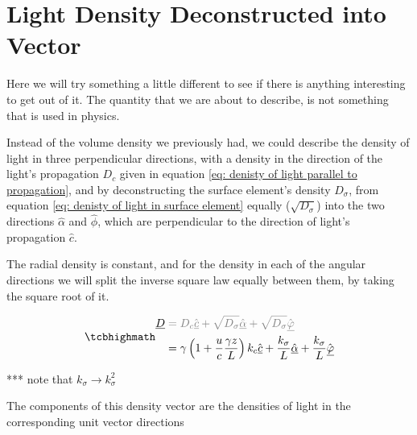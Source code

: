 \section{Light Density Deconstructed into Vector}\label{sect: Field Vector Density}

Here we will try something a little different to see if there is anything interesting to get out of it. The quantity that we are about to describe, is not something that is used in physics.

Instead of the volume density we previously had, we could describe the density of light in three perpendicular directions, with a density in the direction of the light's propagation $D_c$ given in equation \eqref{eq: denisty of light parallel to propagation}, and by deconstructing the surface element's density $D_\sigma$, from equation \eqref{eq: denisty of light in surface element} equally ($\sqrt{D_\sigma}$) into the two directions $\hat{\alpha}$ and $\hat{\phi}$, which are perpendicular to the direction of light's propagation $\hat{c}$.

The radial density is constant, and for the density in each of the angular directions we will split the inverse square law equally between them, by taking the square root of it.


\begin{equation}
	\label{eq: density vector}
	\mhl{
		\begin{aligned}
			\underline{D} & \color{gray} = D_{c} \hat{\underline{c}} + \sqrt{D_{\sigma}}  \hat{\underline{\alpha}} + \sqrt{D_{\sigma}} \hat{\underline{\varphi}}                                           \\
			              & = {\gamma}\left(1 + \dfrac{u}{c}\frac{\gamma z}{L}\right) k_c \hat{\underline{c}} + \frac{k_\sigma}{L} \hat{\underline{\alpha}} + \frac{k_\sigma}{L} \hat{\underline{\varphi}}
		\end{aligned}
	}
\end{equation}

*** note that $k_\sigma \rightarrow k_\sigma^2$

The components of this density vector are the densities of light in the corresponding unit vector directions

